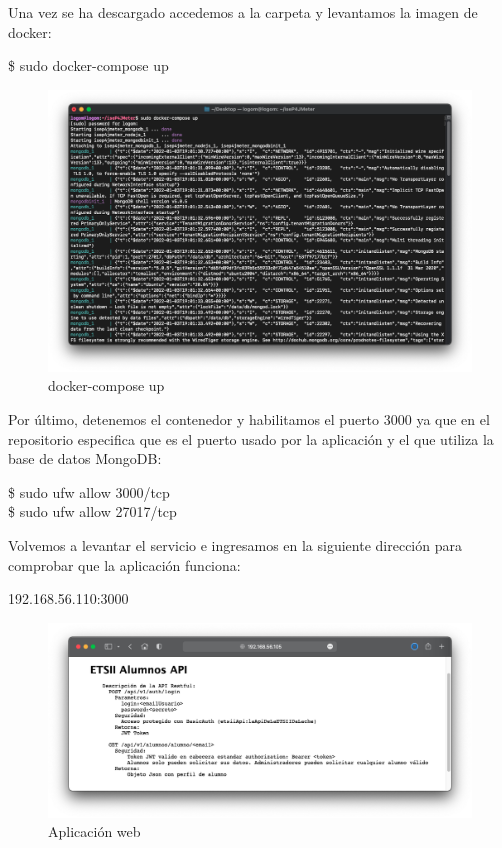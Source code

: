 Una vez se ha descargado accedemos a la carpeta y levantamos la imagen de docker:
\begin{tcolorbox}[colback=black!10, halign=left]
    \$ sudo docker-compose up
\end{tcolorbox}
\begin{figure}[H]
    \centering
    \includegraphics[scale=0.4]{images/docker_compose.png}
    \caption{docker-compose up}
    \label{fig:docker_compose}
\end{figure}

Por último, detenemos el contenedor y habilitamos el puerto 3000 ya que en el repositorio especifica que es el puerto usado por la aplicación y el que utiliza la base
de datos MongoDB:
\begin{tcolorbox}[colback=black!10, halign=left]
    \$ sudo ufw allow 3000/tcp \\
    \$ sudo ufw allow 27017/tcp
\end{tcolorbox}

Volvemos a levantar el servicio e ingresamos en la siguiente dirección para comprobar que la aplicación funciona:
\begin{tcolorbox}[colback=black!10, halign=left]
    192.168.56.110:3000
\end{tcolorbox}
\begin{figure}[H]
    \centering
    \includegraphics[scale=0.33]{images/iseP4JMeter.png}
    \caption{Aplicación web}
    \label{fig:iseP4JMeter}
\end{figure}

